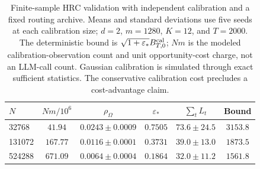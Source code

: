 \begin{table}[!htbp]
\centering
\small
\setlength{\tabcolsep}{4pt}
\caption{Finite-sample HRC validation with independent calibration and a fixed routing archive. Means and standard deviations use five seeds at each calibration size; $d=2$, $m=1280$, $K=12$, and $T=2000$. The deterministic bound is $\sqrt{1+\varepsilon_*}B_{T,0}^{\rm cal}$; $Nm$ is the modeled calibration-observation count and unit opportunity-cost charge, not an LLM-call count. Gaussian calibration is simulated through exact sufficient statistics. The conservative calibration cost precludes a cost-advantage claim.}
\label{tab:hrc-validation}
\begin{tabular}{lccccc}
\toprule
$N$ & $Nm/10^6$ & $\rho_\Omega$ & $\varepsilon_*$ & $\sum_t L_t$ & Bound \\
\midrule
32768 & $41.94$ & $0.0243\pm0.0009$ & $0.7505$ & $73.6\pm24.5$ & $3153.8$ \\
131072 & $167.77$ & $0.0116\pm0.0001$ & $0.3731$ & $39.0\pm13.0$ & $1873.5$ \\
524288 & $671.09$ & $0.0064\pm0.0004$ & $0.1864$ & $32.0\pm11.2$ & $1561.8$ \\
\bottomrule
\end{tabular}
\end{table}
